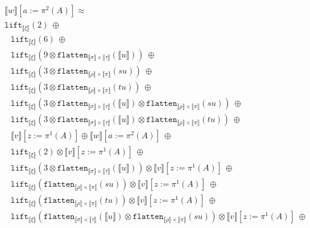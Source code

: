 \documentclass[a4paper,UKenglish,cleveref,autoref,numberwithinsect]{lipics-v2019}
\theoremstyle{definition}
\newcommand{\flatten}{\mathtt{flatten}}
\newcommand{\lift}{\mathtt{lift}}
\newcommand{\typeinterpret}[1]{\llbracket #1 \rrbracket}
\newcommand{\interpret}[1]{\llbracket #1 \rrbracket}
\begin{document}
\begin{itemize}
\[\begin{array}{l}
    \interpret{w}[a:=\pi^2(A)] \approx \\
  \lift_{\typeinterpret{\xi}}(2)\ \oplus \\
  \phantom{A}
     \lift_{\typeinterpret{\xi}}(6)\ \oplus \\
  \phantom{A}
     \lift_{\typeinterpret{\xi}}(9 \otimes
      \flatten_{\typeinterpret{\sigma} \times \typeinterpret{\tau}}(
      \interpret{u}))\ \oplus \\
  \phantom{A}
    \lift_{\typeinterpret{\xi}}(3 \otimes \flatten_{\typeinterpret{\rho}
    \times \typeinterpret{\pi}}(su))\ \oplus \\
  \phantom{A}
    \lift_{\typeinterpret{\xi}}(3 \otimes \flatten_{\typeinterpret{\rho}
    \times \typeinterpret{\pi}}(tu))\ \oplus \\
  \phantom{A}
    \lift_{\typeinterpret{\xi}}(3 \otimes \flatten_{\typeinterpret{\sigma}
    \times \typeinterpret{\tau}}(\interpret{u}) \otimes
    \flatten_{\typeinterpret{\rho} \times \typeinterpret{\pi}}(su))\
    \oplus \\
  \phantom{A}
    \lift_{\typeinterpret{\xi}}(3 \otimes \flatten_{\typeinterpret{\sigma}
    \times \typeinterpret{\tau}}(\interpret{u}) \otimes
    \flatten_{\typeinterpret{\rho} \times \typeinterpret{\pi}}(tu))\
    \oplus \\
  \phantom{A}
    \interpret{v}[z:=\pi^1(A)] \oplus
    \interpret{w}[a:=\pi^2(A)]\ \oplus\ \\
  \phantom{A}
    \lift_{\typeinterpret{\xi}}(2) \otimes
     \interpret{v}[z:=\pi^1(A)]
    \ \oplus \\
  \phantom{A}
    \lift_{\typeinterpret{\xi}}(3 \otimes
    \flatten_{\typeinterpret{\sigma} \times \typeinterpret{\tau}}(
    \interpret{u})) \otimes
     \interpret{v}[z:=\pi^1(A)]
    \ \oplus \\
  \phantom{A}
    \lift_{\typeinterpret{\xi}}(\flatten_{\typeinterpret{\rho} \times
    \typeinterpret{\pi}}(su)) \otimes
     \interpret{v}[z:=\pi^1(A)]
    \ \oplus\\
  \phantom{A}
    \lift_{\typeinterpret{\xi}}(\flatten_{\typeinterpret{\rho} \times
    \typeinterpret{\pi}}(tu)) \otimes
     \interpret{v}[z:=\pi^1(A)]
    \ \oplus \\
  \phantom{A}
    \lift_{\typeinterpret{\xi}}(\flatten_{\typeinterpret{\sigma} \times
    \typeinterpret{\tau}}(\interpret{u}) \otimes
    \flatten_{\typeinterpret{\rho} \times \typeinterpret{\pi}}(su))
    \otimes
     \interpret{v}[z:=\pi^1(A)]
    \ \oplus \\
  \phantom{A}

\end{array}\]
\end{itemize}
\end{document}
